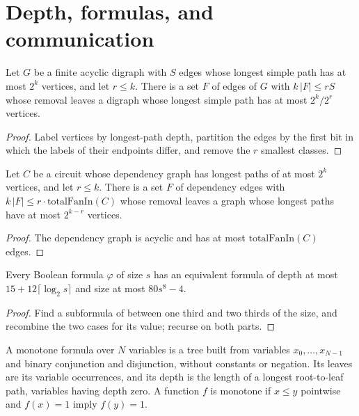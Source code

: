 \section{Depth, formulas, and communication}
\label{sec:lowerbounds-depth}

\begin{theorem}
  \label{thm:lowerbounds-valiant}
  \leanok
  Let $G$ be a finite acyclic digraph with $S$ edges whose longest simple path
  has at most $2^k$ vertices, and let $r \le k$. There is a set $F$ of edges of
  $G$ with $k\,|F| \le r S$ whose removal leaves a digraph whose longest simple
  path has at most $2^k / 2^r$ vertices.
\end{theorem}
\begin{proof}
  \leanok
  Label vertices by longest-path depth, partition the edges by the first bit
  in which the labels of their endpoints differ, and remove the $r$ smallest
  classes.
\end{proof}

\begin{corollary}
  \label{cor:lowerbounds-valiant-circuit}
  Let $C$ be a circuit whose dependency graph has longest paths of at most
  $2^k$ vertices, and let $r \le k$. There is a set $F$ of dependency edges
  with $k\,|F| \le r \cdot \mathrm{totalFanIn}(C)$ whose removal leaves a
  graph whose longest paths have at most $2^{k-r}$ vertices.
\end{corollary}
\begin{proof}
  The dependency graph is acyclic and has at most $\mathrm{totalFanIn}(C)$
  edges.
\end{proof}

\begin{theorem}[Spira]
  \label{thm:lowerbounds-spira}
  \leanok
  Every Boolean formula $\varphi$ of size $s$ has an equivalent formula of
  depth at most $15 + 12 \lceil \log_2 s \rceil$ and size at most
  $80 s^8 - 4$.
\end{theorem}
\begin{proof}
  \leanok
  Find a subformula of between one third and two thirds of the size, and
  recombine the two cases for its value; recurse on both parts.
\end{proof}

\begin{definition}
  \label{def:lowerbounds-monotone-formula}
  \leanok
  A monotone formula over $N$ variables is a tree built from variables
  $x_0, \dots, x_{N-1}$ and binary conjunction and disjunction, without
  constants or negation. Its leaves are its variable occurrences, and its depth
  is the length of a longest root-to-leaf path, variables having depth zero. A
  function $f$ is monotone if $x \le y$ pointwise and $f(x) = 1$ imply
  $f(y) = 1$.
\end{definition}

